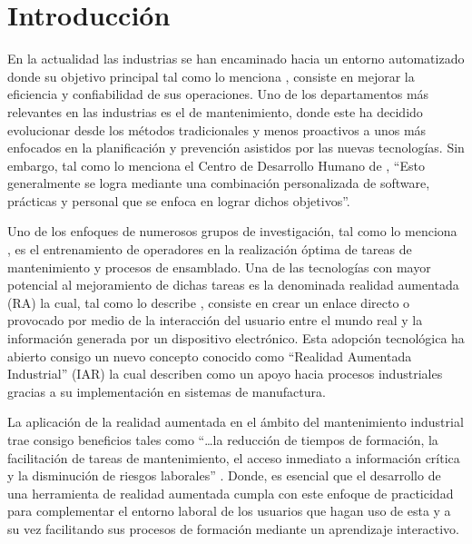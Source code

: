 \section{Introducción}

    En la actualidad las industrias se han encaminado hacia un entorno automatizado donde su objetivo principal tal como lo menciona \citet{MuñozMacias}, consiste en mejorar la eficiencia y confiabilidad de sus operaciones. Uno de los departamentos más relevantes en las industrias es el de mantenimiento, donde este ha decidido evolucionar desde los métodos tradicionales y menos proactivos a unos más enfocados en la planificación y prevención asistidos por las nuevas tecnologías. Sin embargo, tal como lo menciona el Centro de Desarrollo Humano de \citet{FundacionChile}, “Esto generalmente se logra mediante una combinación personalizada de software, prácticas y personal que se enfoca en lograr dichos objetivos”. 

    Uno de los enfoques de numerosos grupos de investigación, tal como lo menciona \citet{MuñozMacias}, es el entrenamiento de operadores en la realización óptima de tareas de mantenimiento y procesos de ensamblado. Una de las tecnologías con mayor potencial al mejoramiento de dichas tareas es la denominada realidad aumentada (RA) la cual, tal como lo describe \citet{ArenasFabio}, consiste en crear un enlace directo o provocado por medio de la interacción del usuario entre el mundo real y la información generada por un dispositivo electrónico. Esta adopción tecnológica ha abierto consigo un nuevo concepto conocido como “Realidad Aumentada Industrial” (IAR) la cual \citet{BondinAndrea} describen como un apoyo hacia procesos industriales gracias a su implementación en sistemas de manufactura. 

    La aplicación de la realidad aumentada en el ámbito del mantenimiento industrial trae consigo beneficios tales como “…la reducción de tiempos de formación, la facilitación de tareas de mantenimiento, el acceso inmediato a información crítica y la disminución de riesgos laborales” \citep{MuñozMacias}. Donde, es esencial que el desarrollo de una herramienta de realidad aumentada cumpla con este enfoque de practicidad para complementar el entorno laboral de los usuarios que hagan uso de esta y a su vez facilitando sus procesos de formación mediante un aprendizaje interactivo.
